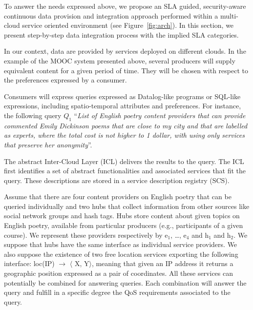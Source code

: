 To answer the needs expressed above, we propose an SLA guided, security-aware continuous data provision and integration approach performed within a multi-cloud service oriented environment  (see
Figure~\ref{fig:arch}). In this section, we present  step-by-step data integration process with the implied  SLA categories.

In our context, data are provided by services deployed on different clouds. In the example of the MOOC system presented above, several producers will supply equivalent content for a given period of time. They    will be chosen with respect to the  preferences expressed by a consumer. 

Consumers will express queries  expressed as  Datalog-like programs or  SQL-like expressions, including spatio-temporal attributes and preferences.
For instance, the following query $Q_1$ ``\textit{List of English poetry content providers that can provide commented Emily Dickinson poems that are close to my city and that are labelled as experts, where the total cost is not higher to 1 dollar, with using only services that preserve her anonymity}''. 

The abstract Inter-Cloud Layer (ICL) delivers the results to the  query. The ICL  first identifies a set of abstract functionalities  and associated services that fit the  query. These descriptions are stored in a service description registry (SCS).

Assume that there are four content providers on English poetry that can be queried individually and two hubs that collect information from other sources like social network groups and hash tags.
Hubs  store content about given topics on  English poetry, available from particular producers (e.g., participants of a given course).
We represent these providers respectively by { e$_1$, \dots, e$_4$} and {h$_1$} and {h$_2$}. We suppose that hubs  have the same interface as individual service providers.
We also suppose the existence of two free location services exporting the following interface: {loc(IP) $\rightarrow$ $\langle$ X, Y$\rangle$}, meaning that given an IP address it returns a geographic position expressed as a pair of coordinates. 
All these services can potentially be combined for answering queries. Each combination will answer the query and fulfill in a specific degree the QoS requirements associated to the query.



